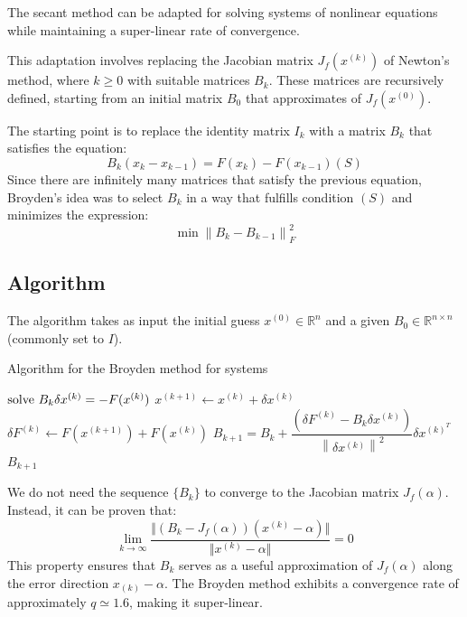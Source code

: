 \documentclass[12pt, a4paper]{report}
\begin{document}
    The secant method can be adapted for solving systems of nonlinear equations while maintaining a super-linear rate of convergence. 
    
    
    This adaptation involves replacing the Jacobian matrix $J_f(x^{(k)})$ of Newton's method, where $k \geq 0$ with suitable matrices $B_k$. 
    These matrices are recursively defined, starting from an initial matrix $B_0$ that approximates of $J_f(x^{(0)})$.
    
    The starting point is to replace the identity matrix $I_k$ with a matrix $B_k$ that satisfies the equation: 
    \[B_k\left(x_k-x_{k-1}\right)=F(x_k)-F(x_{k-1})(S)\]
    Since there are infinitely many matrices that satisfy the previous equation, Broyden's idea was to select $B_k$ in a way that fulfills condition $(S)$ and minimizes the expression:
    \[\min{\left\lVert B_k-B_{k-1} \right\rVert_F^2}\]

    \subsection{Algorithm}
    The algorithm takes as input the initial guess $x^{(0)} \in \mathbb{R}^n$ and a given $B_0 \in \mathbb{R}^{n \times n}$ (commonly set to $I$). 
    \begin{algorithm}[H]
        \caption{Algorithm for the Broyden method for systems}
            \begin{algorithmic}[1]
                    \State $\textnormal{solve  } B_k\delta x^{(k)}=-F(x^{(k)})$
                    \State $x^{(k+1)} \leftarrow x^{(k)}+\delta x^{(k)}$
                    \State $\delta F^{(k)} \leftarrow F(x^{(k+1)})+F(x^{(k)})$
                    \State $B_{k+1}=B_k+\dfrac{\left(\delta F^{(k)}-B_k\delta x^{(k)}\right)}{{\left\lVert \delta x^{(k)} \right\rVert}^{2}}\delta x^{(k)^T}$
                        \State \Return $B_{k+1}$
                    \EndIf
                \EndFor
            \end{algorithmic}
    \end{algorithm}

    We do not need the sequence  $\{B_k\}$ to converge to the Jacobian matrix $J_f(\alpha)$. 
    Instead, it can be proven that:
    \[\lim_{k\rightarrow\infty}\dfrac{\Vert\left(B_k-J_f(\alpha)\right)\left(x^{(k)}-\alpha\right)\Vert}{\Vert x^{(k)}-\alpha\Vert}=0\]
    This property ensures that $B_k$ serves as a useful approximation of $J_f(\alpha)$ along the error direction $x_{(k)}-\alpha$. 
    The Broyden method exhibits a convergence rate of approximately $q \simeq 1.6$, making it super-linear.
\end{document}
